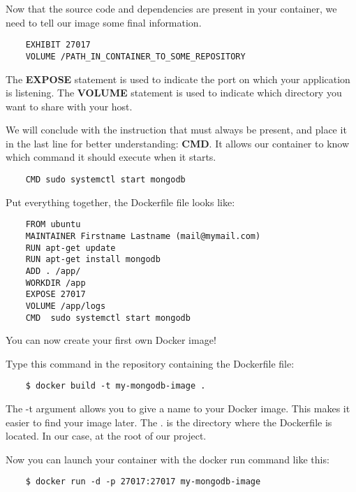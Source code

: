 \documentclass[handout]{beamer}[10pt, usepdftitle=false]
\begin{document}
	\begin{frame}[fragile]
	Now that the source code and dependencies are present in your container, we need to tell our image some final information.
	
	\begin{verbatim}
	EXHIBIT 27017
	VOLUME /PATH_IN_CONTAINER_TO_SOME_REPOSITORY
	\end{verbatim}
	
	The \textbf{EXPOSE} statement is used to indicate the port on which your application is listening. The \textbf{VOLUME} statement is used to indicate which directory you want to share with your host.	
	\vspace*{0.6em}
	
	We will conclude with the instruction that must always be present, and place it in the last line for better understanding: \textbf{CMD}. It allows our container to know which command it should execute when it starts.
	
	\begin{verbatim}
	CMD sudo systemctl start mongodb	
	\end{verbatim}
	
	\end{frame}
		
	\begin{frame}[fragile]
	
	Put everything together, the Dockerfile file looks like:
	\vspace*{0.6em}
	
	\begin{verbatim}
	FROM ubuntu
	MAINTAINER Firstname Lastname (mail@mymail.com)
	RUN apt-get update
	RUN apt-get install mongodb
	ADD . /app/ 
	WORKDIR /app
	EXPOSE 27017
	VOLUME /app/logs
	CMD  sudo systemctl start mongodb	
	\end{verbatim}				
	
	\end{frame}
	\begin{frame}[fragile]
	You can now create your first own Docker image!
	\vspace*{0.6em}
	
	Type this command in the repository containing the Dockerfile file:
	\begin{verbatim}
	$ docker build -t my-mongodb-image .
	\end{verbatim}
	
	The -t argument allows you to give a name to your Docker image. This makes it easier to find your image later.
	The . is the directory where the Dockerfile is located. In our case, at the root of our project. 
	\vspace*{0.6em}

	Now you can launch your container with the docker run command like this:

	\begin{verbatim}
	$ docker run -d -p 27017:27017 my-mongodb-image
	\end{verbatim}
	
	
	\end{frame}
\end{document}
